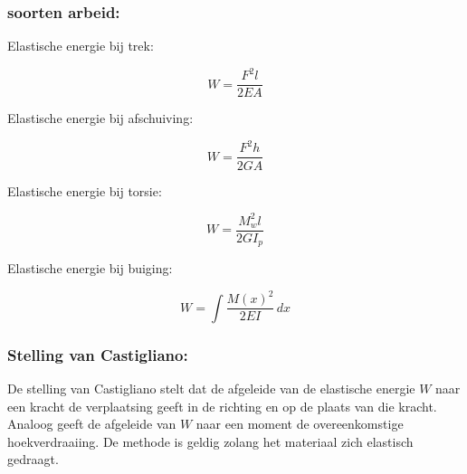 \documentclass[a4paper,11pt]{article}
\begin{document}
\subsubsection*{soorten arbeid:}
\vspace{.2cm}

\noindent
\begin{minipage}[t]{0.42\textwidth}
\noindent Elastische energie bij trek:

\vspace{0.8em}

\begin{equation}
W = \frac{F^2 l}{2EA}
\end{equation}
\end{minipage}
\hfill
\begin{minipage}[t]{0.45\textwidth}
\noindent Elastische energie bij afschuiving:

\vspace{0.8em}

\begin{equation}
W = \frac{F^2 h}{2GA}
\end{equation}
\end{minipage}

\vspace{.5cm}

\noindent
\begin{minipage}[t]{0.42\textwidth}
\noindent Elastische energie bij torsie:

\vspace{0.4cm}

\begin{equation}
W = \frac{M_w^2 l}{2G I_p}
\end{equation}
\end{minipage}
\hfill
\begin{minipage}[t]{0.45\textwidth}
\noindent Elastische energie bij buiging:

\vspace{0.4cm}

\begin{equation}
W = \int \frac{M(x)^2}{2EI}\, dx
\end{equation}
\end{minipage}

\subsubsection*{Stelling van Castigliano:}

De stelling van Castigliano stelt dat de afgeleide van de elastische energie $W$ naar een kracht de verplaatsing geeft in de richting en op de plaats van die kracht. Analoog geeft de afgeleide van $W$ naar een moment de overeenkomstige hoekverdraaiing. De methode is geldig zolang het materiaal zich elastisch gedraagt.
\end{document}
